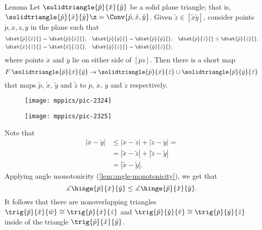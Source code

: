 \begin{thm}{Lemma}\label{lem:quadrangle}
Let $\solidtriangle{\tilde p}{\tilde x}{\tilde y}$ be a solid plane triangle; that is, $\solidtriangle{\tilde p}{\tilde x}{\tilde y}\z=\Conv\{{\tilde p},{\tilde x},{\tilde y}\}$.
Given  $\tilde z\in[\tilde x\tilde y]$,
consider  points $\dot p, \dot x, \dot z, \dot y$ in the plane such that 
\begin{align*}
\dist{\dot p}{\dot x}{}&=\dist{\tilde p}{\tilde x}{},
&
\dist{\dot p}{\dot y}{}&=\dist{\tilde p}{\tilde y}{},
&
\dist{\dot p}{\dot z}{}&\le \dist{\tilde p}{\tilde z}{},
\\
\dist{\dot x}{\dot z}{}&=\dist{\tilde x}{\tilde z}{},
&
\dist{\dot y}{\dot z}{}&=\dist{\tilde y}{\tilde z}{},
\end{align*}
where points $\dot x$ and $\dot y$ lie on either side of $[\dot p\dot z]$.
Then there is a short map 
\[F\:\solidtriangle{\tilde p}{\tilde x}{\tilde y}\to \solidtriangle{\dot p}{\dot x}{\dot z}\cup \solidtriangle{\dot p} {\dot y} {\dot z}\]
that maps $\tilde p$, $\tilde x$, $\tilde y$ and $\tilde z$ to $\dot p$, $\dot x$, $\dot y$ and $\dot z$ respectively.
\end{thm}

\begin{figure}[h!]
\vskip-0mm
\centering
\texttt{[image: mppics/pic-2324]}
\end{figure}

\begin{wrapfigure}{r}{45 mm}
\vskip-4mm
\centering
\texttt{[image: mppics/pic-2325]}
\end{wrapfigure}

Note that 
\begin{align*}
|\dot x-\dot y|&\le |\dot x-\dot z|+|\dot z-\dot y|=
\\
&=|\tilde  x-\tilde  z|+|\tilde  z-\tilde  y|
\\
&=|\tilde  x-\tilde  y|.
\end{align*}
Applying angle monotonicity (\ref{lem:angle-monotonicity}), we get that
\[\measuredangle\hinge{\dot p}{\dot x}{\dot y}\le \measuredangle\hinge{\tilde  p}{\tilde  x}{\tilde  y}.\]
It follows that there are nonoverlapping triangles 
$\trig{\tilde p}{\tilde x}{\tilde w}\cong\trig {\dot p}{\dot x}{\dot z}$ 
and 
$\trig{\tilde p}{\tilde y}{\tilde v}\cong\trig {\dot p}{\dot y}{\dot z}$
 inside of the triangle $\trig{\tilde p}{\tilde x}{\tilde y}$.


